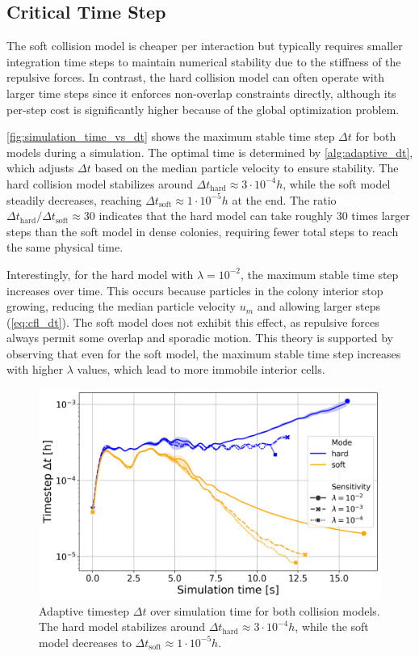 \documentclass[conference]{IEEEtran}
\begin{document}
\subsection{Critical Time Step}

The soft collision model is cheaper per interaction but typically requires smaller integration time steps to maintain numerical stability due to the stiffness of the repulsive forces. In contrast, the hard collision model can often operate with larger time steps since it enforces non-overlap constraints directly, although its per-step cost is significantly higher because of the global optimization problem.

\autoref{fig:simulation_time_vs_dt} shows the maximum stable time step $\Delta t$ for both models during a simulation. The optimal time is determined by \autoref{alg:adaptive_dt}, which adjusts $\Delta t$ based on the median particle velocity to ensure stability. The hard collision model stabilizes around ${\Delta t}_{\text{hard}} \approx 3 \cdot 10^{-4} h$, while the soft model steadily decreases, reaching ${\Delta t}_{\text{soft}} \approx 1 \cdot 10^{-5} h$ at the end. The ratio ${\Delta t}_{\text{hard}}/{\Delta t}_{\text{soft}} \approx 30$ indicates that the hard model can take roughly 30 times larger steps than the soft model in dense colonies, requiring fewer total steps to reach the same physical time.

Interestingly, for the hard model with $\lambda=10^{-2}$, the maximum stable time step increases over time. This occurs because particles in the colony interior stop growing, reducing the median particle velocity $u_m$ and allowing larger steps (\autoref{eq:cfl_dt}). The soft model does not exhibit this effect, as repulsive forces always permit some overlap and sporadic motion. This theory is supported by observing that even for the soft model, the maximum stable time step increases with higher $\lambda$ values, which lead to more immobile interior cells.

\begin{figure}[H]
    \centering
    \includegraphics[width=\linewidth]{figures/comparison_plots/combined_simulation_time [s]_vs_dt.png}
    \caption{Adaptive timestep $\Delta t$ over simulation time for both collision models. The hard model stabilizes around ${\Delta t}_{\text{hard}} \approx 3 \cdot 10^{-4} h$, while the soft model decreases to ${\Delta t}_{\text{soft}} \approx 1 \cdot 10^{-5} h$.} \label{fig:simulation_time_vs_dt}
\end{figure}
\end{document}
